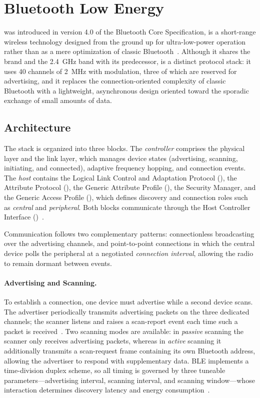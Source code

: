 \documentclass[english,bachelor]{tfgitic}[2026/01/22]
\begin{document}
\section{Bluetooth Low Energy}
\label{sec:ble}

 was introduced in version 4.0 of the Bluetooth Core
Specification, is a short-range wireless technology designed from the ground
up for ultra-low-power operation rather than as a mere optimization of classic
Bluetooth~\cite{bluetooth2023core,gomez2012overview}. Although it shares the
brand and the 2.4~GHz  band with its predecessor,  is a distinct
protocol stack: it uses 40 channels of 2~MHz with  modulation, three of
which are reserved for advertising, and it replaces the connection-oriented
complexity of classic Bluetooth with a lightweight, asynchronous design
oriented toward the sporadic exchange of small amounts of data.

\subsection{Architecture}

The  stack is organized into three blocks. The \emph{controller} comprises
the physical layer and the link layer, which manages device states
(advertising, scanning, initiating, and connected), adaptive frequency hopping,
and connection events. The \emph{host} contains the Logical Link Control and
Adaptation Protocol (), the Attribute Protocol (), the Generic
Attribute Profile (), the Security Manager, and the Generic Access Profile
(), which defines discovery and connection roles such as \emph{central} and
\emph{peripheral}. Both blocks communicate through the Host Controller
Interface ()~\cite{bluetooth2023core,gomez2012overview}.

Communication follows two complementary patterns: connectionless broadcasting
over the advertising channels, and point-to-point connections in which the
central device polls the peripheral at a negotiated \emph{connection interval},
allowing the radio to remain dormant between events.

\paragraph{Advertising and Scanning.} To establish a connection, one device must advertise while a second device
scans. The advertiser periodically transmits advertising packets on the three
dedicated channels; the scanner listens and raises a scan-report event each
time such a packet is received~\cite{silabs_ble_flowcharts}. Two scanning
modes are available: in \emph{passive} scanning the scanner only receives
advertising packets, whereas in \emph{active} scanning it additionally
transmits a scan-request frame containing its own Bluetooth address, allowing
the advertiser to respond with supplementary data. BLE implements a
time-division duplex scheme, so all timing is governed by three tuneable
parameters---advertising interval, scanning interval, and scanning
window---whose interaction determines discovery latency and energy
consumption~\cite{bluetooth2023core}.
\end{document}
